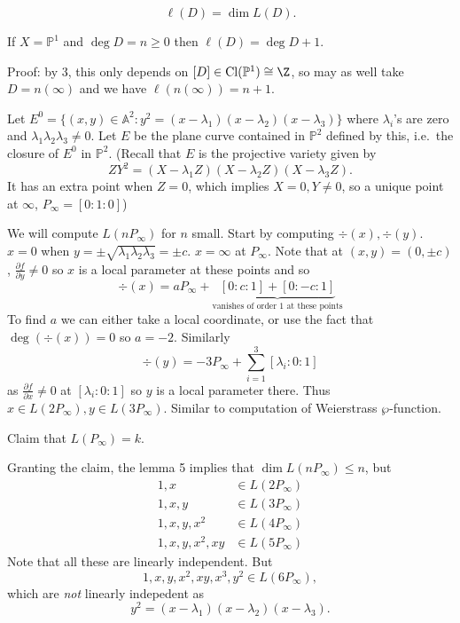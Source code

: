 \documentclass[a4paper]{article}
\renewcommand{\A}{\mathbb{A}}
\DeclareMathOperator{\Cl}{Cl}
\renewcommand*{\P}{\mathbb{P}}
\begin{document}
\begin{definition}
  \[
    \ell(D) = \dim L(D).
  \]
\end{definition}

\begin{eg}
  If \(X = \P^1\) and \(\deg D = n \geq 0\) then \(\ell(D) = \deg D + 1\).

  Proof: by 3, this only depends on \([D] \in \Cl (\P^1) \cong \Z\), so may as well take \(D = n (\infty)\) and we have \(\ell(n (\infty)) = n + 1\).
\end{eg}

\begin{eg}
  Let \(E^0 = \{(x, y) \in \A^2: y^2 = (x - \lambda_1) (x - \lambda_2) (x - \lambda_3)\}\) where \(\lambda_i\)'s are zero and \(\lambda_1 \lambda_2 \lambda_3 \neq 0\). Let \(E\) be the plane curve contained in \(\P^2\) defined by this, i.e.\ the closure of \(E^0\) in \(\P^2\). (Recall that \(E\) is the projective variety given by
  \[
    ZY^2 = (X - \lambda_1Z)(X - \lambda_2Z)(X - \lambda_3Z).
  \]
  It has an extra point when \(Z = 0\), which implies \(X = 0, Y \neq 0\), so a unique point at \(\infty\), \(P_\infty = [0:1:0]\))

  We will compute \(L(nP_\infty)\) for \(n\) small. Start by computing \(\div (x), \div (y)\). \(x = 0\) when \(y = \pm \sqrt{\lambda_1\lambda_2\lambda_3} = \pm c\). \(x = \infty\) at \(P_\infty\). Note that at \((x, y) = (0, \pm c)\), \(\frac{\partial f}{\partial y} \neq 0\) so \(x\) is a local parameter at these points and so
  \[
    \div (x) = a P_\infty + \underbrace{[0:c:1] + [0:-c:1]}_{\text{vanishes of order \(1\) at these points}}
  \]
  To find \(a\) we can either take a local coordinate, or use the fact that \(\deg (\div(x)) = 0\) so \(a = -2\). Similarly
  \[
    \div (y) = -3 P_\infty + \sum_{i = 1}^3 [\lambda_i:0:1]
  \]
  as \(\frac{\partial f}{\partial x} \neq 0\) at \([\lambda_i:0:1]\) so \(y\) is a local parameter there. Thus \(x \in L(2P_\infty), y \in L(3P_\infty)\). Similar to computation of Weierstrass \(\wp\)-function.

  Claim that \(L(P_\infty) = k\).

  Granting the claim, the lemma 5 implies that \(\dim L(nP_\infty) \leq n\), but
  \begin{align*}
    1, x &\in L(2 P_\infty) \\
    1, x, y &\in L(3 P_\infty) \\
    1, x, y, x^2 &\in L(4 P_\infty) \\
    1, x, y, x^2, xy &\in L(5 P_\infty)
  \end{align*}
  Note that all these are linearly independent. But
  \[
    1, x, y, x^2, xy, x^3, y^2 \in L(6 P_\infty),
  \]
  which are \emph{not} linearly indepedent as
  \[
    y^2 = (x - \lambda_1)(x - \lambda_2)(x - \lambda_3).
  \]


\end{eg}
\end{document}
